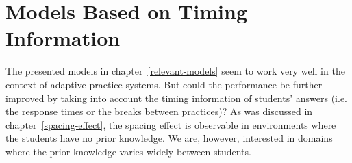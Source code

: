 \chapter{Models Based on Timing Information}

The presented models in chapter~\ref{relevant-models} seem to work very well in the context of adaptive practice systems. But could the performance be further improved by taking into account the timing information of students' answers (i.e. the response times or the breaks between practices)? As was discussed in chapter~\ref{spacing-effect}, the spacing effect is observable in environments where the students have no prior knowledge. We are, however, interested in domains where the prior knowledge varies widely between students.
